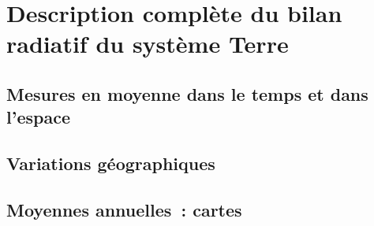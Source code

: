 		

\mk \section{Description complète du bilan radiatif du système Terre}

	\sk \subsection{Mesures en moyenne dans le temps et dans l'espace}

		

	\sk \subsection{Variations géographiques}

		

	\sk \subsection{Moyennes annuelles~: cartes}

		

